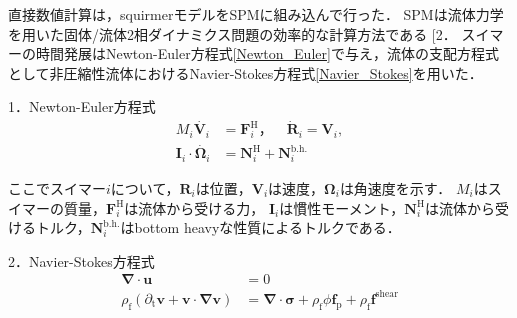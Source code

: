 \documentclass[twocolumns,10pt,a4j]{jarticle}
\makeatletter
\DeclareRobustCommand\cite{\unskip
  \@ifnextchar[{\@tempswatrue\@citex}{\@tempswafalse\@citex[]}}
\makeatother
\begin{document}
直接数値計算は，squirmerモデルをSPMに組み込んで行った．
SPMは流体力学を用いた固体/流体2相ダイナミクス問題の効率的な計算方法である\cite{2}．
スイマーの時間発展はNewton-Euler方程式\eqref{Newton_Euler}で与え，流体の支配方程式として非圧縮性流体におけるNavier-Stokes方程式\eqref{Navier_Stokes}を用いた．

  \par
1．Newton-Euler方程式\\
  \vspace{-6truemm}
  \begin{equation}
    \begin{split}
      M_i \dot{\boldsymbol{V}_i} &= \boldsymbol{F}_i^\mathrm{H}，\quad
      \dot{\boldsymbol{R}}_i = \boldsymbol{V}_i, \\
      \boldsymbol{I}_i \cdot \dot{\boldsymbol{\Omega}_i} &= \boldsymbol{N}_i^\mathrm{H} + \boldsymbol{N}_i^\mathrm{b.h.}
    \end{split}
    \label{Newton_Euler}
  \end{equation}
  \vspace{-4truemm}

  \noindent
ここでスイマー$i$について，$\boldsymbol{R}_i$は位置，$\boldsymbol{V}_i$は速度，$\boldsymbol{\Omega}_i$は角速度を示す．
$M_i$はスイマーの質量，$\boldsymbol{F}_i^\mathrm{H}$は流体から受ける力，
$\boldsymbol{I}_i$は慣性モーメント，$\boldsymbol{N}_i^\mathrm{H}$は流体から受けるトルク，$\boldsymbol{N}_i^\mathrm{b.h.}$はbottom heavyな性質によるトルクである．

  \par
2．Navier-Stokes方程式\\
  \vspace{-6truemm}
  \begin{equation}
    \begin{split}
      \boldsymbol{\nabla}\cdot\boldsymbol{u} &= 0 \\
      \rho_\mathrm{f} \left(\partial_\mathrm{t} \boldsymbol{v} + \boldsymbol{v} \cdot \boldsymbol{\nabla v} \right) &= \boldsymbol{\nabla} \cdot \boldsymbol{\sigma} + \rho_\mathrm{f} \phi \boldsymbol{f}_\mathrm{p} + \rho_\mathrm{f} \boldsymbol{f}^\mathrm{shear}
    \end{split}
    \label{Navier_Stokes}
  \end{equation}
  \vspace{-4truemm}
\end{document}
